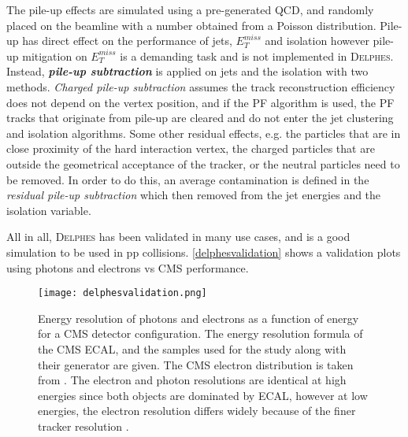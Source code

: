 {The pile-up effects are simulated using a pre-generated QCD, and randomly placed on the beamline with a number obtained from a Poisson distribution. Pile-up has direct effect on the performance of jets, $E_T^{miss}$ and isolation however pile-up mitigation on $E_T^{miss}$ is a demanding task and is not implemented in \textsc{Delphes}. Instead, \emph{\bf{pile-up subtraction}} is applied on jets and the isolation with two methods. \emph{Charged pile-up subtraction} assumes the track reconstruction efficiency does not depend on the vertex position, and if the PF algorithm is used, the PF tracks that originate from pile-up are cleared and do not enter the jet clustering and isolation algorithms. Some other residual effects, e.g. the particles that are in close proximity of the hard interaction vertex, the charged particles that are outside the geometrical acceptance of the tracker, or the neutral particles need to be removed. In order to do this, an average contamination is defined in the \emph{residual pile-up subtraction} which then removed from the jet energies and the isolation variable.

All in all, \textsc{Delphes} has been validated in many use cases, and is a good simulation to be used in pp collisions. \autoref{delphesvalidation} shows a validation plots using photons and electrons vs CMS performance.

\begin{figure}[ht]
	\centering
	\texttt{[image: delphesvalidation.png]}
	\vspace{2mm}
	\caption[Energy resolution of photons and electrons as a function of energy for a CMS detector configuration.  The energy resolution formula of the CMS ECAL, and the samples used for the study along with their generator are given. The CMS electron distribution is taken from . The electron and photon resolutions are identical at high energies since both objects are dominated by ECAL, however at low energies, the electron resolution differs widely because of the finer tracker resolution.]
	{Energy resolution of photons and electrons as a function of energy for a CMS detector configuration.  The energy resolution formula of the CMS ECAL, and the samples used for the study along with their generator are given. The CMS electron distribution is taken from \cite{CMS:2013hoa}. The electron and photon resolutions are identical at high energies since both objects are dominated by ECAL, however at low energies, the electron resolution differs widely because of the finer tracker resolution \cite{deFavereau2014}.}
	\label{delphesvalidation}
\end{figure}

}

